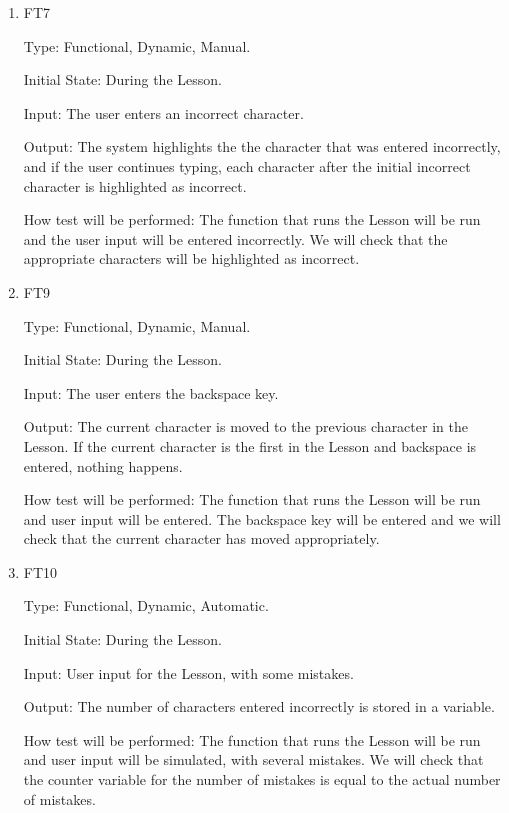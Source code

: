 \documentclass[12pt, titlepage]{article}
\begin{document}
\begin{enumerate}

\item{{\color{cyan}FT7}\\}

Type: Functional, Dynamic, Manual.
					
Initial State: During the Lesson.
					
Input: The user enters an incorrect character.
					
Output: The system highlights the the character that was entered incorrectly, and if the user continues typing, each character after the initial incorrect character is highlighted as incorrect.
					
How test will be performed: The function that runs the Lesson will be run and the user input will be entered incorrectly. We will check that the appropriate characters will be highlighted as incorrect.

\item{{\color{cyan}FT9}\\}

Type: Functional, Dynamic, Manual.
					
Initial State: During the Lesson.
					
Input: The user enters the backspace key.
					
Output: The current character is moved to the previous character in the Lesson. If the current character is the first in the Lesson and backspace is entered, nothing happens.
					
How test will be performed: The function that runs the Lesson will be run and user input will be entered. The backspace key will be entered and we will check that the current character has moved appropriately.

\item{{\color{cyan}FT10}\\}
{\color{cyan}
Type: Functional, Dynamic, Automatic.
					
Initial State: During the Lesson.
					
Input: User input for the Lesson, with some mistakes.
					
Output: The number of characters entered incorrectly is stored in a variable.
					
How test will be performed: The function that runs the Lesson will be run and user input will be simulated, with several mistakes. We will check that the counter variable for the number of mistakes is equal to the actual number of mistakes.}
\end{enumerate}
\end{document}
